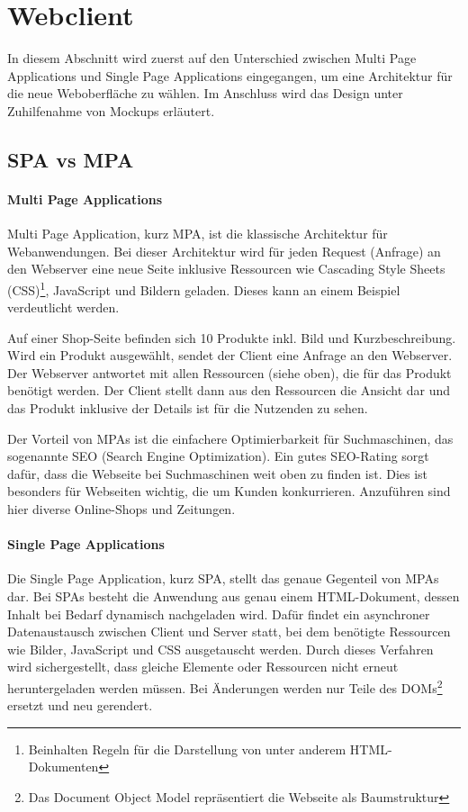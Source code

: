 \section{Webclient} \label{sec:Webclient}
In diesem Abschnitt wird zuerst auf den Unterschied zwischen Multi Page Applications und Single Page Applications eingegangen, um eine Architektur für die neue Weboberfläche zu wählen. Im Anschluss wird das Design unter Zuhilfenahme von Mockups erläutert.

\subsection{SPA vs MPA} \label{subsec:SPA_vs_MPA}

\paragraph{Multi Page Applications} \label{para:Multi_Page_Applications}
Multi Page Application, kurz MPA, ist die klassische Architektur für Webanwendungen. Bei dieser Architektur wird für jeden Request (Anfrage) an den Webserver eine neue Seite inklusive Ressourcen wie Cascading Style Sheets (CSS)\footnote{Beinhalten Regeln für die Darstellung von unter anderem HTML-Dokumenten}, JavaScript und Bildern geladen. Dieses kann an einem Beispiel verdeutlicht werden.

Auf einer Shop-Seite befinden sich 10 Produkte inkl. Bild und Kurzbeschreibung. Wird ein Produkt ausgewählt, sendet der Client eine Anfrage an den Webserver. Der Webserver antwortet mit allen Ressourcen (siehe oben), die für das Produkt benötigt werden. Der Client stellt dann aus den Ressourcen die Ansicht dar und das Produkt inklusive der Details ist für die Nutzenden zu sehen.

Der Vorteil von MPAs ist die einfachere Optimierbarkeit für Suchmaschinen, das sogenannte SEO (Search Engine Optimization). Ein gutes SEO-Rating sorgt dafür, dass die Webseite bei Suchmaschinen weit oben zu finden ist. Dies ist besonders für Webseiten wichtig, die um Kunden konkurrieren. Anzuführen sind hier diverse Online-Shops und Zeitungen.

\paragraph{Single Page Applications} \label{para:Single_Page_Applications}
Die Single Page Application, kurz SPA, stellt das genaue Gegenteil von MPAs dar. Bei SPAs besteht die Anwendung aus genau einem HTML-Dokument, dessen Inhalt bei Bedarf dynamisch nachgeladen wird. Dafür findet ein asynchroner Datenaustausch zwischen Client und Server statt, bei dem benötigte Ressourcen wie Bilder, JavaScript und CSS ausgetauscht werden. Durch dieses Verfahren wird sichergestellt, dass gleiche Elemente oder Ressourcen nicht erneut heruntergeladen werden müssen. Bei Änderungen werden nur Teile des DOMs\footnote{Das Document Object Model repräsentiert die Webseite als Baumstruktur} ersetzt und neu gerendert.


